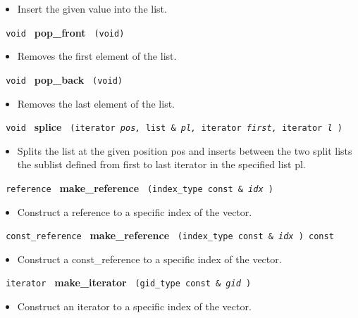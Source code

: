 \begin{itemize}
\item
Insert the given value into the list. 
\end{itemize}
 
\noindent
\texttt{%
void 	
}
\textbf{pop\_front}%
\texttt{
(void)
}
 	
\begin{itemize}
\item
Removes the first element of the list.
\end{itemize}
 
\noindent
\texttt{%
void 	
}
\textbf{pop\_back}%
\texttt{
(void)
}
 	
\begin{itemize}
\item
Removes the last element of the list.
\end{itemize}
 
\noindent
\texttt{%
void 	
}
\textbf{splice}%
\texttt{
(iterator 
\textit{pos,}%
list \&
\textit{pl,}%
iterator 
\textit{first,}%
iterator 
\textit{l}%
)
}
 	
\begin{itemize}
\item
Splits the list at the given position pos and inserts between the two split lists the sublist defined from first to last iterator in the specified list pl.
\end{itemize}

 
\noindent
\texttt{%
reference
}
\textbf{make\_reference}%
\texttt{%
(index\_type const \&
\textit{idx}%
)
}

\begin{itemize}
\item
Construct a reference to a specific index of the vector.
\end{itemize}
 
\noindent
\texttt{%
const\_reference
}
\textbf{make\_reference}%
\texttt{%
(index\_type const \&
\textit{idx}%
) const
}

\begin{itemize}
\item
Construct a const\_reference to a specific index of the vector.
\end{itemize}
 
\noindent
\texttt{%
iterator
}
\textbf{make\_iterator}%
\texttt{%
(gid\_type const \&
\textit{gid}%
)
}

\begin{itemize}
\item
Construct an iterator to a specific index of the vector.
\end{itemize}
 
